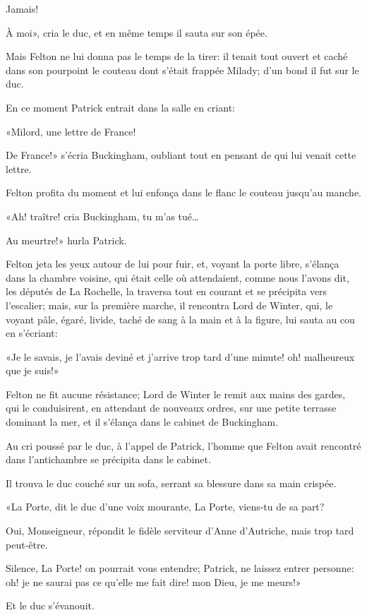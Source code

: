 \speak  Jamais! 

\speak  À moi», cria le duc, et en même temps il sauta sur son épée. 

Mais Felton ne lui donna pas le temps de la tirer: il tenait tout ouvert et caché dans son pourpoint le couteau dont s'était frappée Milady; d'un bond il fut sur le duc. 

En ce moment Patrick entrait dans la salle en criant: 

«Milord, une lettre de France! 

\speak  De France!» s'écria Buckingham, oubliant tout en pensant de qui lui venait cette lettre. 

Felton profita du moment et lui enfonça dans le flanc le couteau jusqu'au manche. 

«Ah! traître! cria Buckingham, tu m'as tué\dots 

\speak  Au meurtre!» hurla Patrick. 

Felton jeta les yeux autour de lui pour fuir, et, voyant la porte libre, s'élança dans la chambre voisine, qui était celle où attendaient, comme nous l'avons dit, les députés de La Rochelle, la traversa tout en courant et se précipita vers l'escalier; mais, sur la première marche, il rencontra Lord de Winter, qui, le voyant pâle, égaré, livide, taché de sang à la main et à la figure, lui sauta au cou en s'écriant: 

«Je le savais, je l'avais deviné et j'arrive trop tard d'une minute! oh! malheureux que je suis!» 

Felton ne fit aucune résistance; Lord de Winter le remit aux mains des gardes, qui le conduisirent, en attendant de nouveaux ordres, sur une petite terrasse dominant la mer, et il s'élança dans le cabinet de Buckingham. 

Au cri poussé par le duc, à l'appel de Patrick, l'homme que Felton avait rencontré dans l'antichambre se précipita dans le cabinet. 

Il trouva le duc couché sur un sofa, serrant sa blessure dans sa main crispée. 

«La Porte, dit le duc d'une voix mourante, La Porte, viens-tu de sa part? 

\speak  Oui, Monseigneur, répondit le fidèle serviteur d'Anne d'Autriche, mais trop tard peut-être. 

\speak  Silence, La Porte! on pourrait vous entendre; Patrick, ne laissez entrer personne: oh! je ne saurai pas ce qu'elle me fait dire! mon Dieu, je me meurs!» 

Et le duc s'évanouit. 

